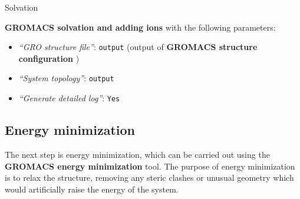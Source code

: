 \documentclass[twocolumn]{bmcart}%
\providecommand{\tightlist}{%
  \setlength{\itemsep}{0pt}\setlength{\parskip}{0pt}}
\begin{document}
\begin{handson_box_colour}{Solvation}


  \textbf{GROMACS solvation and adding ions} with the following
  parameters:
  \begin{itemize}
  \tightlist
  \item
    \emph{``GRO structure file''}: \texttt{output} (output of
    \textbf{GROMACS structure configuration} )
  \item
    \emph{``System topology''}: \texttt{output}
  \item
    \emph{``Generate detailed log''}: \texttt{Yes}
  \end{itemize}

\end{handson_box_colour}

\subsection*{Energy minimization}\label{energy-minimization}

The next step is energy minimization, which can be carried out using the
\textbf{GROMACS energy minimization} tool. The purpose of energy minimization is to relax the structure, removing any steric clashes or unusual geometry which would artificially raise the energy of the system.
\end{document}
